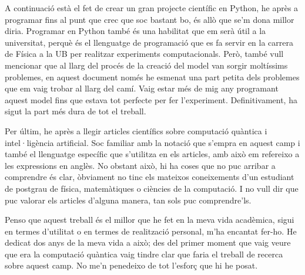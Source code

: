 A continuació està el fet de crear un gran projecte científic en Python, he après a programar fins al punt que crec que soc bastant bo, és allò que se'm dona millor diria. Programar en Python també és una habilitat que em serà útil a la universitat, perquè és el llenguatge de programació que es fa servir en la carrera de Física a la UB per realitzar experiments computacionals. Però, també vull mencionar que al llarg del procés de la creació del model van sorgir moltíssims problemes, en aquest document només he esmenat una part petita dels problemes que em vaig trobar al llarg del camí. Vaig estar més de mig any programant aquest model fins que estava tot perfecte per fer l'experiment. Definitivament, ha sigut la part més dura de tot el treball.

Per últim, he après a llegir articles científics sobre computació quàntica i intel·ligència artificial. Soc familiar amb la notació que s'empra en aquest camp i també el llenguatge específic que s'utilitza en els articles, amb això em refereixo a les expressions en anglès. No obstant això, hi ha coses que no puc arribar a comprendre és clar, òbviament no tinc els mateixos coneixements d'un estudiant de postgrau de física, matemàtiques o ciències de la computació. I no vull dir que puc valorar els articles d'alguna manera, tan sols puc comprendre'ls.

Penso que aquest treball és el millor que he fet en la meva vida acadèmica, sigui en termes d'utilitat o en termes de realització personal, m'ha encantat fer-ho. He dedicat dos anys de la meva vida a això; des del primer moment que vaig veure que era la computació quàntica vaig tindre clar que faria el treball de recerca sobre aquest camp. No me'n penedeixo de tot l'esforç que hi he posat.
